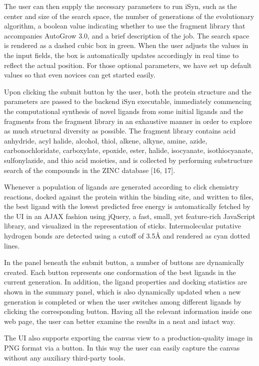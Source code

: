 The user can then supply the necessary parameters to run iSyn, such as the center and size of the search space, the number of generations of the evolutionary algorithm, a boolean value indicating whether to use the fragment library that accompanies AutoGrow 3.0, and a brief description of the job. The search space is rendered as a dashed cubic box in green. When the user adjusts the values in the input fields, the box is automatically updates accordingly in real time to reflect the actual position. For those optional parameters, we have set up default values so that even novices can get started easily.

Upon clicking the submit button by the user, both the protein structure and the parameters are passed to the backend iSyn executable, immediately commencing the computational synthesis of novel ligands from some initial ligands and the fragments from the fragment library in an exhaustive manner in order to explore as much structural diversity as possible. The fragment library contains acid anhydride, acyl halide, alcohol, thiol, alkene, alkyne, amine, azide, carbonochloridate, carboxylate, epoxide, ester, halide, isocyanate, isothiocyanate, sulfonylazide, and thio acid moieties, and is collected by performing substructure search of the compounds in the ZINC database [16, 17].

Whenever a population of ligands are generated according to click chemistry reactions, docked against the protein within the binding site, and written to files, the best ligand with the lowest predicted free energy is automatically fetched by the UI in an AJAX fashion using jQuery, a fast, small, yet feature-rich JavaScript library, and visualized in the representation of sticks. Intermolecular putative hydrogen bonds are detected using a cutoff of 3.5Å and rendered as cyan dotted lines.

In the panel beneath the submit button, a number of buttons are dynamically created. Each button represents one conformation of the best ligands in the current generation. In addition, the ligand properties and docking statistics are shown in the summary panel, which is also dynamically updated when a new generation is completed or when the user switches among different ligands by clicking the corresponding button. Having all the relevant information inside one web page, the user can better examine the results in a neat and intact way.

The UI also supports exporting the canvas view to a production-quality image in PNG format via a button. In this way the user can easily capture the canvas without any auxiliary third-party tools.

